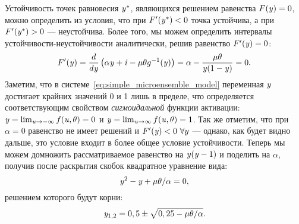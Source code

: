 Устойчивость точек равновесия $\mathit{y}^{*}$, являющихся решением равенства $F(\mathit{y}) = 0$, можно определить из условия, что при $F^{\prime}(\mathit{y}^{*}) < 0$ точка устойчива, а при $F^{\prime}(\mathit{y}^{*}) > 0$ --- неустойчива. Более того, мы можем определить интервалы устойчивости-неустойчивости аналитически, решив равенство $F^{\prime}(\mathit{y}) = 0$:
\begin{equation}
    \nonumber
    F^{\prime}(\mathit{y}) 
    = \dfrac{d}{d\mathit{y}}\left( \alpha \mathit{y} + \mathit{i} - \mu \theta g^{-1}(\mathit{y}) \right) 
    = \alpha - \dfrac{\mu \theta}{\mathit{y}(1 - \mathit{y})}
    = 0.
\end{equation}
Заметим, что в системе~\eqref{eq:simple_microensemble_model} переменная $\mathit{y}$ достигает крайних значений 0 и 1 лишь в пределе, что определяется соответствующим свойством \textit{сигмоидальной} функции активации: $\mathit{y} = \lim_{\mathit{u} \to -\infty} f(\mathit{u}, \theta) = 0$ и $\mathit{y} = \lim_{\mathit{u} \to \infty} f(\mathit{u}, \theta) = 1$. Так же отметим, что при $\alpha = 0$ равенство не имеет решений и $F^{\prime}(\mathit{y}) < 0\ \forall y$ --- однако, как будет видно дальше, это условие входит в более общее условие устойчивости. Теперь мы можем домножить рассматриваемое равенство на $\mathit{y}(\mathit{y} - 1)$ и поделить на $\alpha$, получив после раскрытия скобок квадратное уравнение вида:
\begin{equation}
    \nonumber
    \mathit{y}^{2} - \mathit{y} + \mu \theta / \alpha = 0,
\end{equation}
решением которого будут корни:
\begin{equation}
    \label{eq:sigm_stability_bounds_y}
    \mathit{y}_{1,2} = 0,5 \pm \sqrt{0,25 - \mu \theta / \alpha}.
\end{equation}

